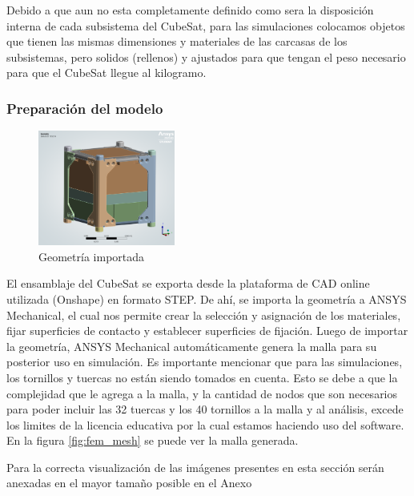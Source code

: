     Debido a que aun no esta completamente definido como sera la disposición interna de cada subsistema del CubeSat,
    para las simulaciones colocamos objetos que tienen las mismas dimensiones y materiales de las carcasas de los
    subsistemas, pero solidos (rellenos) y ajustados para que tengan el peso necesario para que el CubeSat llegue al
    kilogramo.

    \subsubsection{Preparación del modelo}
      \begin{figure}
        \vspace{-0.5cm}
        \centering
        \includegraphics[width=0.4\textwidth]{image/fem/ansys_cubesat-geometry.png}
        \caption{Geometría importada}
        \label{fig:fem_geo}
      \end{figure}
      \hspace*{2em}
      El ensamblaje del CubeSat se exporta desde la plataforma de CAD online utilizada (Onshape) en formato STEP. De
      ahí, se importa la geometría a ANSYS Mechanical, el cual nos permite crear la selección y asignación de los
      materiales, fijar superficies de contacto y establecer superficies de fijación. Luego de importar la geometría,
      ANSYS Mechanical automáticamente genera la malla para su posterior uso en simulación.  Es importante mencionar que
      para las simulaciones, los tornillos y tuercas no están siendo tomados en cuenta. Esto se debe a que la
      complejidad que le agrega a la malla, y la cantidad de nodos que son necesarios para poder incluir las 32 tuercas
      y los 40 tornillos a la malla y al análisis, excede los limites de la licencia educativa por la cual estamos
      haciendo uso del software. En la figura \ref{fig:fem_mesh} se puede ver la malla generada.

      Para la correcta visualización de las imágenes presentes en esta sección serán anexadas en el mayor tamaño posible
      en el Anexo

